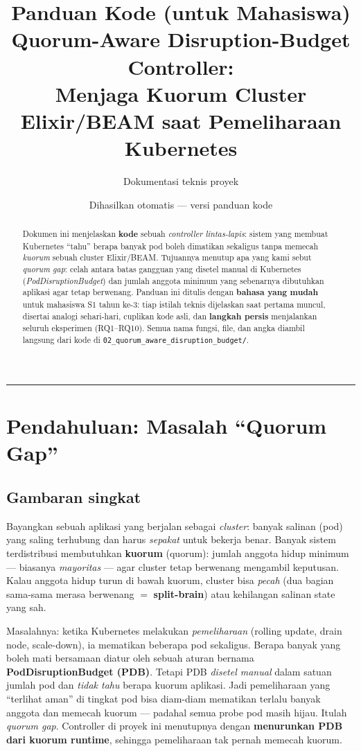 \documentclass[11pt]{article}
\title{\textbf{Panduan Kode (untuk Mahasiswa)}\\[4pt]
\large Quorum-Aware Disruption-Budget Controller:\\
Menjaga Kuorum Cluster Elixir/BEAM saat Pemeliharaan Kubernetes}
\author{Dokumentasi teknis proyek \code{02\_quorum\_aware\_disruption\_budget}}
\date{Dihasilkan otomatis --- versi panduan kode}
\newcommand{\code}[1]{\texttt{\small #1}}
\newcommand{\istilah}[1]{\textbf{#1}}
\begin{document}
\maketitle

\begin{abstract}
\noindent
Dokumen ini menjelaskan \textbf{kode} sebuah \emph{controller lintas-lapis}: sistem yang membuat
Kubernetes ``tahu'' berapa banyak pod boleh dimatikan sekaligus tanpa memecah \emph{kuorum} sebuah
cluster Elixir/BEAM. Tujuannya menutup apa yang kami sebut \emph{quorum gap}: celah antara batas
gangguan yang disetel manual di Kubernetes (\emph{PodDisruptionBudget}) dan jumlah anggota minimum yang
sebenarnya dibutuhkan aplikasi agar tetap berwenang. Panduan ini ditulis dengan \textbf{bahasa yang
mudah} untuk mahasiswa S1 tahun ke-3: tiap istilah teknis dijelaskan saat pertama muncul, disertai
analogi sehari-hari, cuplikan kode asli, dan \textbf{langkah persis} menjalankan seluruh eksperimen
(RQ1--RQ10). Semua nama fungsi, file, dan angka diambil langsung dari kode di
\code{02\_quorum\_aware\_disruption\_budget/}.
\end{abstract}

\tableofcontents
\bigskip \hrule \bigskip

\section{Pendahuluan: Masalah ``Quorum Gap''}
\label{sec:intro}

\subsection{Gambaran singkat}
Bayangkan sebuah aplikasi yang berjalan sebagai \emph{cluster}: banyak salinan (pod) yang saling
terhubung dan harus \emph{sepakat} untuk bekerja benar. Banyak sistem terdistribusi membutuhkan
\istilah{kuorum} (quorum): jumlah anggota hidup minimum --- biasanya \emph{mayoritas} --- agar cluster
tetap berwenang mengambil keputusan. Kalau anggota hidup turun di bawah kuorum, cluster bisa
\emph{pecah} (dua bagian sama-sama merasa berwenang $=$ \istilah{split-brain}) atau kehilangan salinan
state yang sah.

Masalahnya: ketika Kubernetes melakukan \emph{pemeliharaan} (rolling update, drain node, scale-down),
ia mematikan beberapa pod sekaligus. Berapa banyak yang boleh mati bersamaan diatur oleh sebuah aturan
bernama \istilah{PodDisruptionBudget (PDB)}. Tetapi PDB \emph{disetel manual} dalam satuan jumlah pod
dan \emph{tidak tahu} berapa kuorum aplikasi. Jadi pemeliharaan yang ``terlihat aman'' di tingkat pod
bisa diam-diam mematikan terlalu banyak anggota dan memecah kuorum --- padahal semua probe pod masih
hijau. Itulah \emph{quorum gap}. Controller di proyek ini menutupnya dengan \textbf{menurunkan PDB dari
kuorum runtime}, sehingga pemeliharaan tak pernah memecah kuorum.
\end{document}
